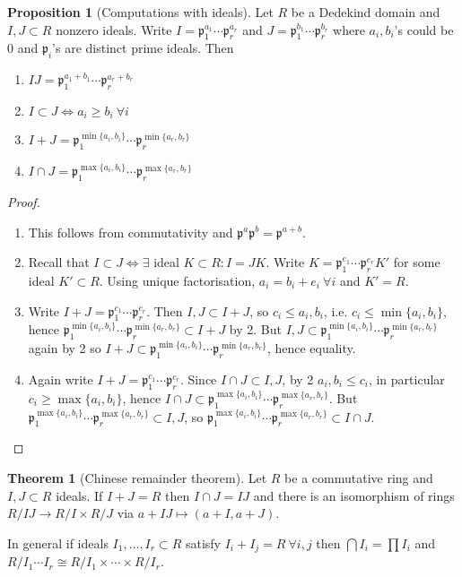 \documentclass{article}
\newcommand{\ip}{\mathfrak{p}}
\theoremstyle{definition}
\newtheorem{prop}[defn]{Proposition}
\newtheorem{thm}[defn]{Theorem}
\begin{document}
\begin{prop}[Computations with ideals]
\label{prop:computationswithideals}
Let $R$ be a Dedekind domain and $I,J\subset R$ nonzero ideals. Write $I=\ip_1^{a_1}\cdots\ip_r^{a_r}$ and $J=\ip_1^{b_1}\cdots\ip_r^{b_r}$ where $a_i,b_i$'s could be 0 and $\ip_i$'s are distinct prime ideals. Then
\begin{enumerate}
\item $IJ=\ip_1^{a_1+b_1}\cdots\ip_r^{a_r+b_r}$
\item $I\subset J\iff a_i\geq b_i \ \forall i$
\item $I+J=\ip_1^{\min\{a_i,b_i\}}\cdots\ip_r^{\min\{a_r,b_r\}}$
\item $I\cap J=\ip_1^{\max\{a_i,b_i\}}\cdots\ip_r^{\max\{a_r,b_r\}}$
\end{enumerate}
\end{prop}
\begin{proof}
\begin{enumerate}
\item This follows from commutativity and $\ip^a\ip^b=\ip^{a+b}$.
\item Recall that $I\subset J\iff\exists$ ideal $K\subset R:I=JK$. Write $K=\ip_1^{e_1}\cdots\ip_r^{e_r}K'$ for some ideal $K'\subset R$. Using unique factorisation, $a_i=b_i+e_i \ \forall i$ and $K'=R$.
\item Write $I+J=\ip_1^{c_1}\cdots\ip_r^{c_r}$. Then $I,J\subset I+J$, so $c_i\leq a_i,b_i$, i.e. $c_i\leq\min\{a_i,b_i\}$, hence $\ip_1^{\min\{a_i,b_i\}}\cdots\ip_r^{\min\{a_r,b_r\}}\subset I+J$ by 2. But $I,J\subset\ip_1^{\min\{a_i,b_i\}}\cdots\ip_r^{\min\{a_r,b_r\}}$ again by 2 so $I+J\subset\ip_1^{\min\{a_i,b_i\}}\cdots\ip_r^{\min\{a_r,b_r\}}$, hence equality.
\item Again write $I+J=\ip_1^{c_1}\cdots\ip_r^{c_r}$. Since $I\cap J\subset I,J$, by 2 $a_i,b_i\leq c_i$, in particular $c_i\geq\max\{a_i,b_i\}$, hence $I\cap J\subset \ip_1^{\max\{a_i,b_i\}}\cdots\ip_r^{\max\{a_r,b_r\}}$. But $\ip_1^{\max\{a_i,b_i\}}\cdots\ip_r^{\max\{a_r,b_r\}}\subset I,J$, so $\ip_1^{\max\{a_i,b_i\}}\cdots\ip_r^{\max\{a_r,b_r\}}\subset I\cap J$.
\end{enumerate}
\end{proof}

\begin{thm}[Chinese remainder theorem]
Let $R$ be a commutative ring and $I,J\subset R$ ideals. If $I+J=R$ then $I\cap J=IJ$ and there is an isomorphism of rings $R/IJ\rightarrow R/I\times R/J$ via $a+IJ\mapsto (a+I,a+J)$.
\end{thm}
In general if ideals $I_1,\ldots,I_r\subset R$ satisfy $I_i+I_j=R \ \forall i,j$ then $\bigcap I_i=\prod I_i$ and $R/I_1\cdots I_r\cong R/I_1\times\cdots\times R/I_r$.
\end{document}

